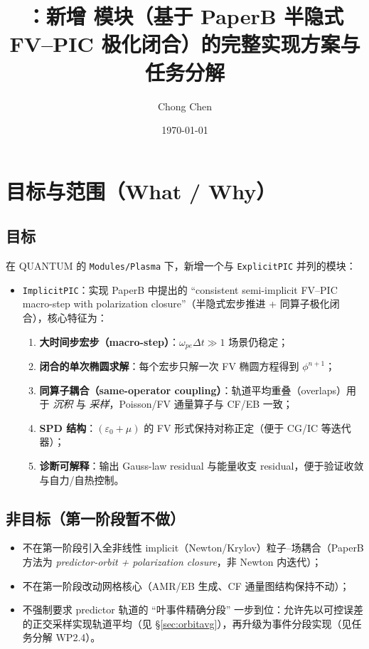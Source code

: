 \documentclass[UTF8,a4paper,12pt]{ctexart}
\title{\QUANTUM{}：新增 \code{ImplicitPIC} 模块（基于 PaperB 半隐式 FV--PIC 极化闭合）的完整实现方案与任务分解}
\author{Chong Chen}
\date{\today}
\newcommand{\code}[1]{\texttt{#1}}
\newcommand{\QUANTUM}{\textsc{QUANTUM}}
\newcommand{\dt}{\Delta t}
\begin{document}
\maketitle

\section{目标与范围（What / Why）}

\subsection{目标}
在 \QUANTUM{} 的 \code{Modules/Plasma} 下，新增一个与 \code{ExplicitPIC} 并列的模块：
\begin{itemize}[leftmargin=2em]
  \item \code{ImplicitPIC}：实现 PaperB 中提出的 ``consistent semi-implicit FV--PIC macro-step with polarization closure''（半隐式宏步推进 + 同算子极化闭合），核心特征为：
  \begin{enumerate}[leftmargin=2em]
    \item \textbf{大时间步宏步（macro-step）}：$\omega_{pe}\dt \gg 1$ 场景仍稳定；
    \item \textbf{闭合的单次椭圆求解}：每个宏步只解一次 FV 椭圆方程得到 $\phi^{n+1}$；
    \item \textbf{同算子耦合（same-operator coupling）}：轨道平均重叠（overlaps）用于 \emph{沉积} 与 \emph{采样}，Poisson/FV 通量算子与 CF/EB 一致；
    \item \textbf{SPD 结构}：$(\varepsilon_0+\mu)$ 的 FV 形式保持对称正定（便于 CG/IC 等迭代器）；
    \item \textbf{诊断可解释}：输出 Gauss-law residual 与能量收支 residual，便于验证收敛与自力/自热控制。
  \end{enumerate}
\end{itemize}

\subsection{非目标（第一阶段暂不做）}
\begin{itemize}[leftmargin=2em]
  \item 不在第一阶段引入全非线性 implicit（Newton/Krylov）粒子--场耦合（PaperB 方法为 \emph{predictor-orbit + polarization closure}，非 Newton 内迭代）；
  \item 不在第一阶段改动网格核心（AMR/EB 生成、CF 通量图结构保持不动）；
  \item 不强制要求 predictor 轨道的 ``叶事件精确分段'' 一步到位：允许先以可控误差的正交采样实现轨道平均（见 \S\ref{sec:orbitavg}），再升级为事件分段实现（见任务分解 WP2.4）。
\end{itemize}
\end{document}
